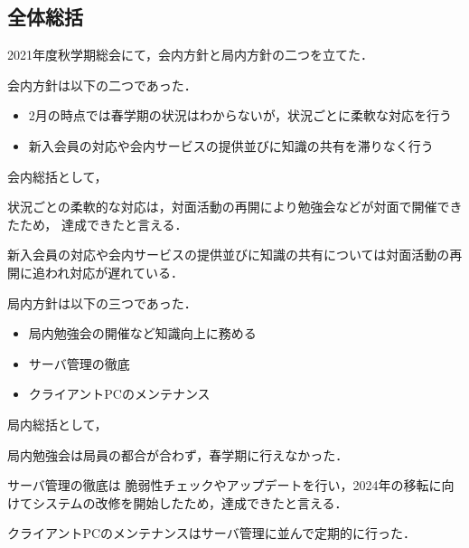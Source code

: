 \subsection*{全体総括}


2021年度秋学期総会にて，会内方針と局内方針の二つを立てた．

会内方針は以下の二つであった．
\begin{itemize}
  \item 2月の時点では春学期の状況はわからないが，状況ごとに柔軟な対応を行う
  \item 新入会員の対応や会内サービスの提供並びに知識の共有を滞りなく行う
\end{itemize}
会内総括として，

状況ごとの柔軟的な対応は，対面活動の再開により勉強会などが対面で開催できたため，
達成できたと言える．

新入会員の対応や会内サービスの提供並びに知識の共有については対面活動の再開に追われ対応が遅れている．

局内方針は以下の三つであった．
\begin{itemize}
  \item 局内勉強会の開催など知識向上に務める
  \item サーバ管理の徹底
  \item クライアントPCのメンテナンス
\end{itemize}
局内総括として，

局内勉強会は局員の都合が合わず，春学期に行えなかった．

サーバ管理の徹底は
脆弱性チェックやアップデートを行い，2024年の移転に向けてシステムの改修を開始したため，達成できたと言える．

クライアントPCのメンテナンスはサーバ管理に並んで定期的に行った．
